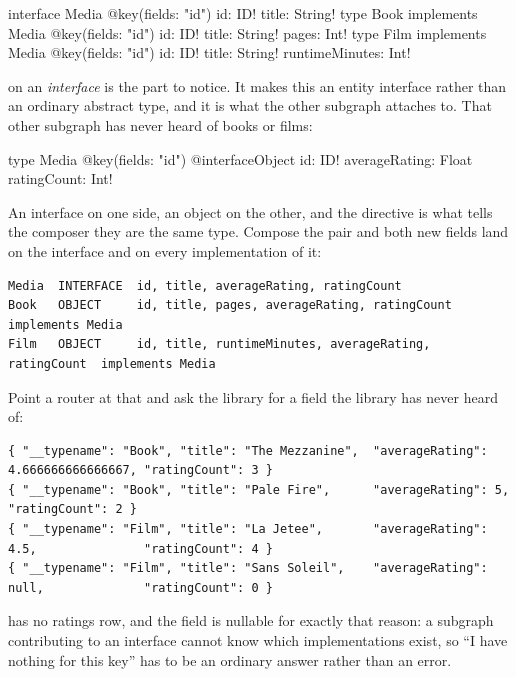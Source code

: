 \begin{graphqlsdl}[fontsize=\footnotesize]
interface Media @key(fields: "id") { id: ID! title: String! }
type Book implements Media @key(fields: "id") { id: ID! title: String! pages: Int! }
type Film implements Media @key(fields: "id") { id: ID! title: String! runtimeMinutes: Int! }
\end{graphqlsdl}

 on an \emph{interface} is the part to notice. It makes this an entity
interface rather than an ordinary abstract type, and it is what the other
subgraph attaches to. That other subgraph has never heard of books or films:

\begin{graphqlsdl}[fontsize=\footnotesize]
type Media @key(fields: "id") @interfaceObject {
  id: ID!
  averageRating: Float
  ratingCount: Int!
}
\end{graphqlsdl}

An interface on one side, an object on the other, and the directive is what tells
the composer they are the same type. Compose the pair and both new fields land on
the interface and on every implementation of it:

\begin{verbatim}
Media  INTERFACE  id, title, averageRating, ratingCount
Book   OBJECT     id, title, pages, averageRating, ratingCount           implements Media
Film   OBJECT     id, title, runtimeMinutes, averageRating, ratingCount  implements Media
\end{verbatim}

Point a router at that and ask the library for a field the library has never
heard of:

\begin{verbatim}
{ "__typename": "Book", "title": "The Mezzanine",  "averageRating": 4.666666666666667, "ratingCount": 3 }
{ "__typename": "Book", "title": "Pale Fire",      "averageRating": 5,                 "ratingCount": 2 }
{ "__typename": "Film", "title": "La Jetee",       "averageRating": 4.5,               "ratingCount": 4 }
{ "__typename": "Film", "title": "Sans Soleil",    "averageRating": null,              "ratingCount": 0 }
\end{verbatim}

 has no ratings row, and the field is nullable for exactly that
reason: a subgraph contributing to an interface cannot know which
implementations exist, so \enquote{I have nothing for this key} has to be an
ordinary answer rather than an error.

